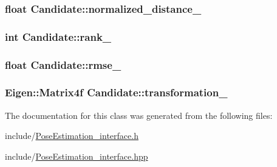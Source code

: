 \hypertarget{classCandidate_a03bdc19e0ee68d095ef402c1ae8857e6}{
\subsubsection[{normalized\-\_\-distance\-\_\-}]{\setlength{\rightskip}{0pt plus 5cm}float Candidate\-::normalized\-\_\-distance\-\_\-\hspace{0.3cm}{\ttfamily [private]}}}\label{classCandidate_a03bdc19e0ee68d095ef402c1ae8857e6}
\hypertarget{classCandidate_a671df007d258250715bfa7f80df4162c}{
\subsubsection[{rank\-\_\-}]{\setlength{\rightskip}{0pt plus 5cm}int Candidate\-::rank\-\_\-\hspace{0.3cm}{\ttfamily [private]}}}\label{classCandidate_a671df007d258250715bfa7f80df4162c}
\hypertarget{classCandidate_a1794f08bfc0b49287159c85034b23654}{
\subsubsection[{rmse\-\_\-}]{\setlength{\rightskip}{0pt plus 5cm}float Candidate\-::rmse\-\_\-\hspace{0.3cm}{\ttfamily [private]}}}\label{classCandidate_a1794f08bfc0b49287159c85034b23654}
\hypertarget{classCandidate_ac6dd9ee10ce1bf011b1005cfa239cc7b}{
\subsubsection[{transformation\-\_\-}]{\setlength{\rightskip}{0pt plus 5cm}Eigen\-::\-Matrix4f Candidate\-::transformation\-\_\-\hspace{0.3cm}{\ttfamily [private]}}}\label{classCandidate_ac6dd9ee10ce1bf011b1005cfa239cc7b}


The documentation for this class was generated from the following files\-:\begin{DoxyCompactItemize}
\item 
include/\hyperlink{PoseEstimation__interface_8h}{Pose\-Estimation\-\_\-interface.\-h}\item 
include/\hyperlink{PoseEstimation__interface_8hpp}{Pose\-Estimation\-\_\-interface.\-hpp}\end{DoxyCompactItemize}
